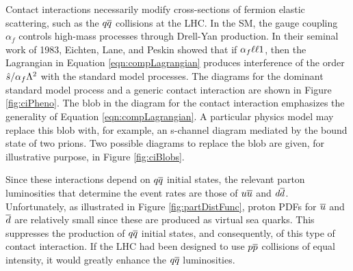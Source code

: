 Contact interactions necessarily modify cross-sections of fermion elastic scattering, such as the $q\overline{q}$ collisions at the LHC.
In the SM, the gauge coupling $\alpha_f$ controls high-mass processes through Drell-Yan production.
In their seminal work of 1983, Eichten, Lane, and Peskin showed that if $\alpha_f\llt1$, then the Lagrangian in Equation \ref{eqn:compLagrangian} produces interference of the order $\hat{s}/\alpha_f\Lambda^2$ with the standard model processes. \cite{eichten}
The diagrams for the dominant standard model process and a generic contact interaction are shown in Figure \ref{fig:ciPheno}.
The blob in the diagram for the contact interaction emphasizes the generality of Equation \ref{eqn:compLagrangian}. A particular physics model may replace this blob with, for example, an s-channel diagram mediated by the bound state of two prions.
Two possible diagrams to replace the blob are given, for illustrative purpose, in Figure \ref{fig:ciBlobs}.

Since these interactions depend on $q\overline{q}$ initial states, the relevant parton luminosities that determine the event rates are those of $u\overline{u}$ and $d\overline{d}$.
Unfortunately, as illustrated in Figure \ref{fig:partDistFunc}, proton PDFs for $\overline{u}$ and $\overline{d}$ are relatively small since these are produced as virtual sea quarks.
This suppresses the production of $q\overline{q}$ initial states, and consequently, of this type of contact interaction.
If the LHC had been designed to use $p\overline{p}$ collisions of equal intensity, it would greatly enhance the $q\overline{q}$ luminosities.

